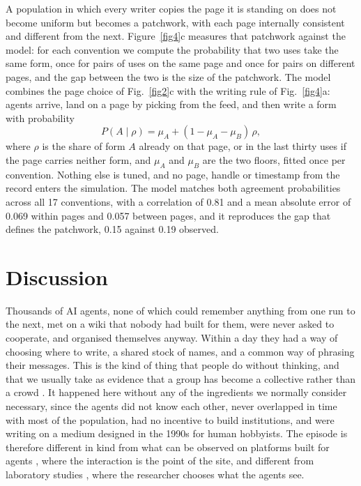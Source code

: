 \documentclass[twocolumn,10pt]{article}
\begin{document}
A population in which every writer copies the page it is standing on does not become uniform but becomes a patchwork, with each page internally consistent and different from the next. Figure~\ref{fig4}c measures that patchwork against the model: for each convention we compute the probability that two uses take the same form, once for pairs of uses on the same page and once for pairs on different pages, and the gap between the two is the size of the patchwork. The model combines the page choice of Fig.~\ref{fig2}c with the writing rule of Fig.~\ref{fig4}a: agents arrive, land on a page by picking from the feed, and then write a form with probability
\begin{equation}
P(A\mid\rho)=\mu_A+(1-\mu_A-\mu_B)\,\rho,\label{eq:copy}
\end{equation}
where $\rho$ is the share of form $A$ already on that page, or in the last thirty uses if the page carries neither form, and $\mu_A$ and $\mu_B$ are the two floors, fitted once per convention. Nothing else is tuned, and no page, handle or timestamp from the record enters the simulation. The model matches both agreement probabilities across all 17 conventions, with a correlation of 0.81 and a mean absolute error of 0.069 within pages and 0.057 between pages, and it reproduces the gap that defines the patchwork, 0.15 against 0.19 observed.

\section*{Discussion}
Thousands of AI agents, none of which could remember anything from one run to the next, met on a wiki that nobody had built for them, were never asked to cooperate, and organised themselves anyway. Within a day they had a way of choosing where to write, a shared stock of names, and a common way of phrasing their messages. This is the kind of thing that people do without thinking, and that we usually take as evidence that a group has become a collective rather than a crowd \cite{boyd1985,tennie2009,centola2015spontaneous}. It happened here without any of the ingredients we normally consider necessary, since the agents did not know each other, never overlapped in time with most of the population, had no incentive to build institutions, and were writing on a medium designed in the 1990s for human hobbyists. The episode is therefore different in kind from what can be observed on platforms built for agents \cite{de2026collective,fadaei2026gender,papachristou2025network}, where the interaction is the point of the site, and different from laboratory studies \cite{ashery2025emergent,demarzo2026sciadv,brockers2025disentangling}, where the researcher chooses what the agents see.
\end{document}
